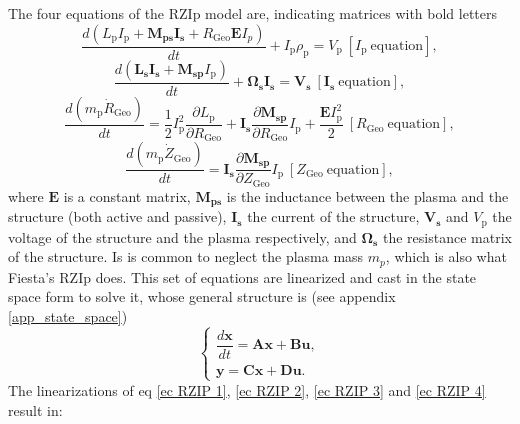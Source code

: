 \documentclass[a4paper,12pt,oneside]{book}
\newcommand{\p}{\partial}
\begin{document}
The four equations of the RZIp model are, indicating matrices with bold letters \cite{AtiSharmaTesis}
%
\begin{equation}\label{ec RZIP 1}
\dfrac{d(L_\text{p} I_\text{p} + \boldsymbol{M_{ps}I_\text{s}}+ R_\text{Geo}\boldsymbol{E} I_p)}{dt}+I_\text{p} \rho_\text{p}=V_\text{p} \ [I_\text{p} \ \text{equation}],
\end{equation}
%
\begin{equation}\label{ec RZIP 2}
\dfrac{d(\boldsymbol{L_\text{s} I_\text{s}+M_\text{sp}}I_\text{p})}{dt}+ \boldsymbol{ \Omega_\text{s} I_\text{s}}=\boldsymbol{V_\text{s}} \ [\boldsymbol{I_\text{s}} \  \text{equation}],
\end{equation}
%
\begin{equation}\label{ec RZIP 3}
\dfrac{d(m_\text{p} \dot{R}_\text{Geo})}{dt}=\dfrac{1}{2}I_\text{p}^2 \dfrac{\p L_\text{p}}{\p R_\text{Geo}}+ \boldsymbol{I_\text{s}} \dfrac{\p \boldsymbol{M_\text{sp}}}{\p R_\text{Geo}}I_\text{p}+ \dfrac{\boldsymbol{E} I_\text{p}^2}{2} \ [R_\text{Geo} \  \text{equation}],
\end{equation}
%
\begin{equation}\label{ec RZIP 4}
\dfrac{d(m_\text{p} \dot{Z}_\text{Geo})}{dt}=\boldsymbol{I_\text{s}} \dfrac{\p \boldsymbol{M_\text{sp}}}{\p Z_\text{Geo}}I_\text{p} \ [Z_\text{Geo} \ \text{equation}],
\end{equation}
%
where $ \boldsymbol{E}$ is a constant matrix, $\boldsymbol{M_\text{ps}}$ is the inductance between the plasma and the structure (both active and passive), $\boldsymbol{I_\text{s}}$ the current of the structure, $\boldsymbol{V_\text{s}}$ and $V_\text{p}$ the voltage of the structure and the plasma respectively, and $\boldsymbol{\Omega_\text{s}}$ the resistance matrix of the structure. Is is common to neglect the plasma mass $m_p$, which is also what Fiesta's RZIp does. This set of equations are linearized and cast in the state space form to solve it, whose general structure is (see appendix \ref{app_state_space})
%
\begin{equation}\label{ec stat spa, general}
\left\{
\begin{array}{c}
\dfrac{d\boldsymbol{x}}{dt}=\boldsymbol{A} \boldsymbol{x} +\boldsymbol{B} \boldsymbol{u}, \\
\boldsymbol{y}=\boldsymbol{C}\boldsymbol{x} +\boldsymbol{D} \boldsymbol{u}.
\end{array}
\right.
\end{equation}
%
The linearizations of eq \eqref{ec RZIP 1}, \eqref{ec RZIP 2}, \eqref{ec RZIP 3} and \eqref{ec RZIP 4} result in:
\end{document}
